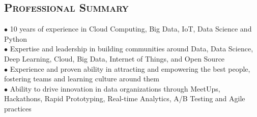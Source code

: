 \begin{resume}


\section{\textsc{Professional Summary}}
$\bullet$ 10 years of experience in Cloud Computing, Big Data, IoT, Data Science and Python\\
$\bullet$ Expertise and leadership in building communities around Data, Data Science, Deep Learning, Cloud, Big Data, Internet of Things, and Open Source\\
$\bullet$ Experience and proven ability in attracting and empowering the best people, fostering teams and learning culture around them\\
$\bullet$ Ability to drive innovation in data organizations through MeetUps, Hackathons, Rapid Prototyping, Real-time Analytics, A/B Testing and Agile practices



\end{resume}
